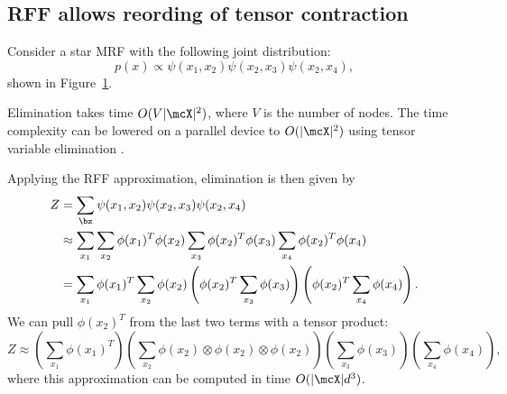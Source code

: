 \documentclass{article}
\begin{document}
\subsection{RFF allows reording of tensor contraction}
Consider a star MRF with the following joint distribution:
\begin{equation}
p(x) \propto \psi(x_1, x_2) \psi(x_2, x_3) \psi(x_2, x_4),
\end{equation}
shown in Figure~\ref{fig:star-mrf}.
\begin{figure}[htb!]
\centering
{}
\caption{
\label{fig:star-mrf}
}
\end{figure}
Elimination takes time $O(V|\mcX|^2)$, where $V$ is the number of nodes.
The time complexity can be lowered on a parallel device to $O(|\mcX|^2)$
using tensor variable elimination \citep{obermeyer2019tve}.

Applying the RFF approximation, elimination is then given by
\begin{equation}
\label{eqn:star}
\begin{aligned}
Z &= \sum_\bz \psi(x_1, x_2) \psi(x_2, x_3) \psi(x_2, x_4) \\
&\approx \sum_{x_1} \sum_{x_2} \phi(x_1)^T\phi(x_2)
    \sum_{x_3} \phi(x_2)^T\phi(x_3) \sum_{x_4} \phi(x_2)^T\phi(x_4)\\
&= \sum_{x_1} \phi(x_1)^T \sum_{x_2} \phi(x_2)
    \left(\phi(x_2)^T \sum_{x_3} \phi(x_3)\right)
    \left(\phi(x_2)^T\sum_{x_4} \phi(x_4)\right).
\end{aligned}
\end{equation}
We can pull $\phi(x_2)^T$ from the last two terms with a tensor product:
\begin{equation}
Z \approx \left(\sum_{x_1} \phi(x_1)^T \right)
\left(\sum_{x_2} \phi(x_2) \otimes\phi(x_2) \otimes \phi(x_2)  \right)
\left(\sum_{x_3} \phi(x_3)\right) 
\left(\sum_{x_4} \phi(x_4)\right),
\end{equation}
where this approximation can be computed in time $O(|\mcX|d^3)$.
\end{document}

